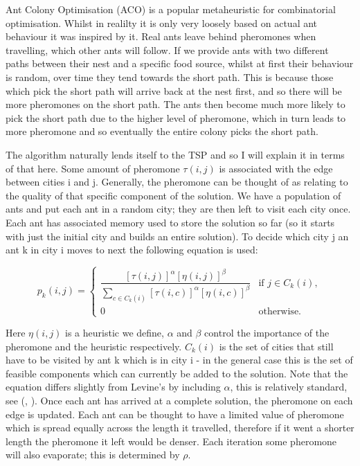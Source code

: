 \documentclass[12pt]{article}
\begin{document}
Ant Colony Optimisation (ACO) is a popular metaheuristic for combinatorial optimisation. Whilst in realilty it is only very loosely based on actual ant behaviour it was inspired by it. Real ants leave behind pheromones when travelling, which other ants will follow. If we provide ants with two different paths between their nest and a specific food source, whilst at first their behaviour is random, over time they tend towards the short path. This is because those which pick the short path will arrive back at the nest first, and so there will be more pheromones on the short path. The ants then become much more likely to pick the short path due to the higher level of pheromone, which in turn leads to more pheromone and so eventually the entire colony picks the short path. 

The algorithm naturally lends itself to the TSP and so I will explain it in terms of that here. Some amount of pheromone $\tau(i, j)$ is associated with the edge between cities i and j. Generally, the pheromone can be thought of as relating to the quality of that specific component of the solution. We have a population of ants and put each ant in a random city; they are then left to visit each city once. Each ant has associated memory used to store the solution so far (so it starts with just the initial city and builds an entire solution).  To decide which city j an ant k in city i moves to next the following equation is used: 

\[
p_k(i,j) =
\begin{cases}
\dfrac{[\tau(i,j)]^{\alpha}[\eta(i,j)]^{\beta}}
{\sum\limits_{c \in C_k(i)} [\tau(i,c)]^{\alpha} [\eta(i,c)]^{\beta}} & \text{if } j \in C_k(i), \\[10pt]
0 & \text{otherwise}.
\end{cases}
\]

Here $\eta(i, j)$ is a heuristic we define, $\alpha$ and $\beta$ control the importance of the pheromone and the heuristic respectively. $C_k(i)$ is the set of cities that still have to be visited by ant k which is in city i - in the general case this is the set of feasible components which can currently be added to the solution. Note that the equation differs slightly from Levine’s by including $\alpha$, this is relatively standard, see (\cite{aaron}, \cite{gendreau}). Once each ant has arrived at a complete solution, the pheromone on each edge is updated. Each ant can be thought to have a limited value of pheromone which is spread equally across the length it travelled, therefore if it went a shorter length the pheromone it left would be denser. Each iteration some pheromone will also evaporate; this is determined by $\rho$. 
\end{document}
